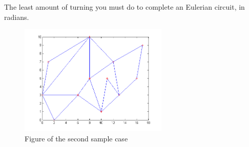 \Output
The least amount of turning you must do to complete an Eulerian circuit, in radians.\\



\begin{figure}
\centering
\includegraphics[width=\linewidth,height=150pt,keepaspectratio=true]{roundtrip/roundtrip2}
\caption{Figure of the second sample case}
\end{figure}